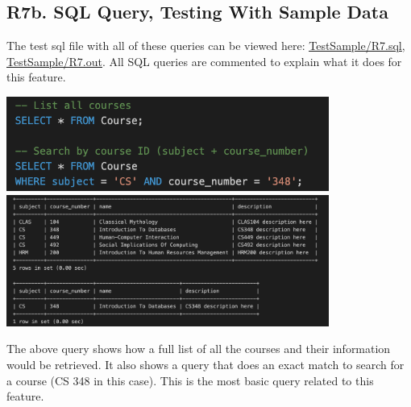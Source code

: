 \documentclass[12pt, a4paper]{article}
\begin{document}
\subsection*{R7b. SQL Query, Testing With Sample Data}
The test sql file with all of these queries can be viewed here: \underline{\href{https://github.com/Kggupta/DegreeMap/tree/main/Database/Queries/TestSample}{TestSample/R7.sql}}, \underline{\href{https://github.com/Kggupta/DegreeMap/tree/main/Database/Queries/TestSample}{TestSample/R7.out}}. All SQL queries are commented to explain what it does for this feature.
\begin{center}
    \includegraphics[width=400px]{R7/q1}
    \includegraphics[width=400px]{R7/q1out}
\end{center}
The above query shows how a full list of all the courses and their information would be retrieved. It also shows a query that does an exact match to search for a course (CS 348 in this case). This is the most basic query related to this feature.
\end{document}
